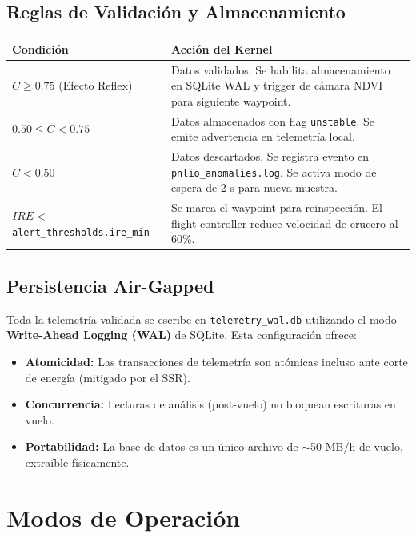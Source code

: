 \subsection{Reglas de Validación y Almacenamiento}

\begin{table}[h]
\centering
\begin{tabular}{|p{4cm}|p{9cm}|}
\hline
\textbf{Condición} & \textbf{Acción del Kernel} \\ \hline
$C \geq 0.75$ (Efecto Reflex) & Datos validados. Se habilita almacenamiento en SQLite WAL y trigger de cámara NDVI para siguiente waypoint. \\ \hline
$0.50 \leq C < 0.75$ & Datos almacenados con flag \texttt{unstable}. Se emite advertencia en telemetría local. \\ \hline
$C < 0.50$ & Datos descartados. Se registra evento en \texttt{pnlio\_anomalies.log}. Se activa modo de espera de 2 s para nueva muestra. \\ \hline
$IRE <$ \texttt{alert\_thresholds.ire\_min} & Se marca el waypoint para reinspección. El flight controller reduce velocidad de crucero al 60\%. \\ \hline
\end{tabular}
\end{table}

\subsection{Persistencia Air-Gapped}

Toda la telemetría validada se escribe en \texttt{telemetry\_wal.db} utilizando el modo \textbf{Write-Ahead Logging (WAL)} de SQLite. Esta configuración ofrece:

\begin{itemize}
    \item \textbf{Atomicidad:} Las transacciones de telemetría son atómicas incluso ante corte de energía (mitigado por el SSR).
    \item \textbf{Concurrencia:} Lecturas de análisis (post-vuelo) no bloquean escrituras en vuelo.
    \item \textbf{Portabilidad:} La base de datos es un único archivo de $\sim$50 MB/h de vuelo, extraíble físicamente.
\end{itemize}

\section{Modos de Operación}

